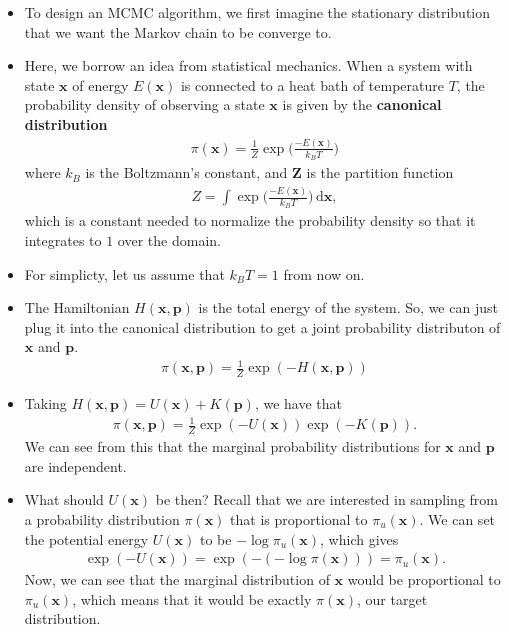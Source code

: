 \documentclass[10pt]{article}
\newcommand{\dee}{\mathrm{d}}
\newcommand{\ve}[1]{\mathbf{#1}}
\begin{document}
\begin{itemize}
  \item To design an MCMC algorithm, we first imagine the stationary distribution that we want the Markov chain to be converge to.

  \item Here, we borrow an idea from statistical mechanics. When a system with state $\ve{x}$ of energy $E(\ve{x})$ is connected to a heat bath of temperature $T$, the probability density of observing a state $\ve{x}$ is given by the {\bf canonical distribution}
  \begin{align*}
    \pi(\ve{x}) = \frac{1}{Z}\exp\bigg( \frac{-E(\ve{x})}{k_B T} \bigg)
  \end{align*}
  where $k_B$ is the Boltzmann's constant, and $\ve{Z}$ is the partition function
  \begin{align*}
    Z = \int \exp\bigg( \frac{-E(\ve{x})}{k_B T} \bigg)\, \dee\ve{x},
  \end{align*}
  which is a constant needed to normalize the probability density so that it integrates to $1$ over the domain.

  \item For simplicty, let us assume that $k_B T = 1$ from now on.
  
  \item The Hamiltonian $H(\ve{x},\ve{p})$ is the total energy of the system. So, we can just plug it into the canonical distribution to get a joint probability distributon of $\ve{x}$ and $\ve{p}$.
  \begin{align*}
    \pi(\ve{x},\ve{p}) = \frac{1}{Z} \exp( -H(\ve{x},\ve{p}) )
  \end{align*}

  \item Taking $H(\ve{x},\ve{p}) = U(\ve{x}) + K(\ve{p})$, we have that
  \begin{align} \label{eqn:phase-space-prob}
    \pi(\ve{x},\ve{p}) = \frac{1}{Z} \exp(-U(\ve{x})) \exp(-K(\ve{p})). 
  \end{align}
  We can see from this that the marginal probability distributions for $\ve{x}$ and $\ve{p}$ are independent.

  \item What should $U(\ve{x})$ be then? Recall that we are interested in sampling from a probability distribution $\pi(\ve{x})$ that is proportional to $\pi_u(\ve{x})$. We can set the potential energy $U(\ve{x})$ to be $-\log \pi_u(\ve{x})$, which gives
  \begin{align*}
    \exp(-U(\ve{x})) = \exp(-(-\log \pi(\ve{x}))) = \pi_u(\ve{x}).
  \end{align*}
  Now, we can see that the marginal distribution of $\ve{x}$ would be proportional to $\pi_u(\ve{x})$, which means that it would be exactly $\pi(\ve{x})$, our target distribution. 


\end{itemize}
\end{document}
